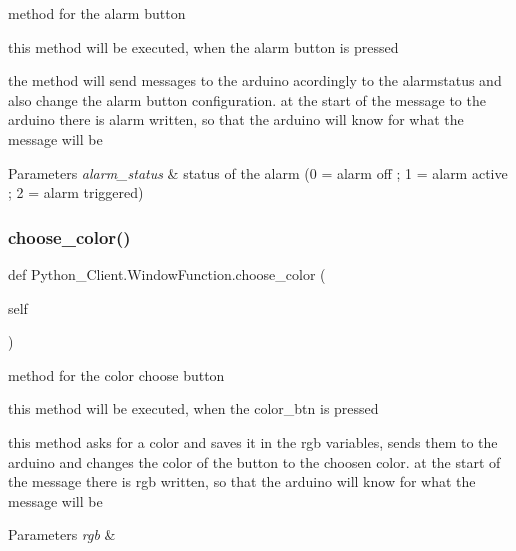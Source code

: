 method for the alarm button 

this method will be executed, when the alarm button is pressed

the method will send messages to the arduino acordingly to the alarmstatus and also change the alarm button configuration. at the start of the message to the arduino there is alarm written, so that the arduino will know for what the message will be


\begin{DoxyParams}{Parameters}
{\em alarm\+\_\+status} & status of the alarm (0 = alarm off ; 1 = alarm active ; 2 = alarm triggered) \\
\hline
\end{DoxyParams}
\mbox{\label{class_python___client_1_1_window_function_a065ec1b6535adc5009029b90060ed44e}} 
\subsubsection{\texorpdfstring{choose\+\_\+color()}{choose\_color()}}
{\footnotesize\ttfamily def Python\+\_\+\+Client.\+Window\+Function.\+choose\+\_\+color (\begin{DoxyParamCaption}\item[{}]{self }\end{DoxyParamCaption})}



method for the color choose button 

this method will be executed, when the color\+\_\+btn is pressed

this method asks for a color and saves it in the rgb variables, sends them to the arduino and changes the color of the button to the choosen color. at the start of the message there is rgb written, so that the arduino will know for what the message will be


\begin{DoxyParams}{Parameters}
{\em rgb} & \\
\hline
\end{DoxyParams}
\mbox{\label{class_python___client_1_1_window_function_a48e25dc456e930042a87bbec5239c458}} 
